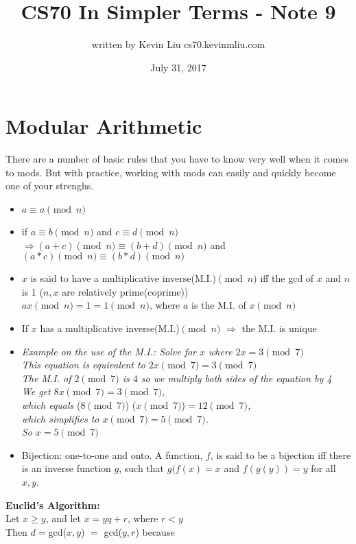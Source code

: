 \documentclass[a4paper]{article}
\title{CS70 In Simpler Terms - Note 9}
\author{written by Kevin Liu cs70.kevinmliu.com}
\date{July 31, 2017}
\begin{document}
\maketitle

\section{Modular Arithmetic}
There are a number of basic rules that you have to know very well when it comes to mods. But with practice, working with mods can easily and quickly become one of your strenghs.
\begin{itemize}
    \item $a \equiv a\pmod n$
    \item if $a \equiv b \pmod n$ and $c \equiv d \pmod n$ \\
            $\Rightarrow (a+c)\pmod n \equiv (b+d)\pmod n$ and \\
            $(a*c)\pmod n \equiv (b*d)\pmod n$
    \item $x$ is said to have a multiplicative inverse(M.I.)$\pmod n$ iff the gcd of $x$ and $n$ is 1 ($n, x$ are relatively prime(coprime))\\
    $ax\pmod n = 1 = 1\pmod n$, where $a$ is the M.I. of $x\pmod n$
    \item If $x$ has a multiplicative inverse(M.I.)$\pmod n$ $\Rightarrow$ the M.I. is unique
    \item \textit{Example on the use of the M.I.: Solve for $x$ where $2x = 3\pmod 7$\\ This equation is equivalent to $2x\pmod 7 = 3\pmod 7$\\ The M.I. of $2\pmod 7$ is $4$ so we multiply both sides of the equation by 4\\ We get $8x\pmod 7 = 3\pmod 7$,\\ which equals} ($8\pmod 7$) ($x\pmod 7$)\textit{$= 12\pmod 7$, \\
    which simplifies to $x\pmod 7 = 5\pmod 7$. \\So $x=5\pmod 7$}
    \item Bijection: one-to-one and onto. A function, $f$, is said to be a bijection iff there is an inverse function $g$, such that $g(f(x) = x$ and $f(g(y)) = y$ for all $x,y$.

\end{itemize}
\textbf{Euclid's Algorithm:} \\
Let $x \geq y$, and let $x = yq + r$, where $r < y$\\ Then $d=$gcd($x,y$) $=$ gcd($y,r$) because\\
\end{document}
